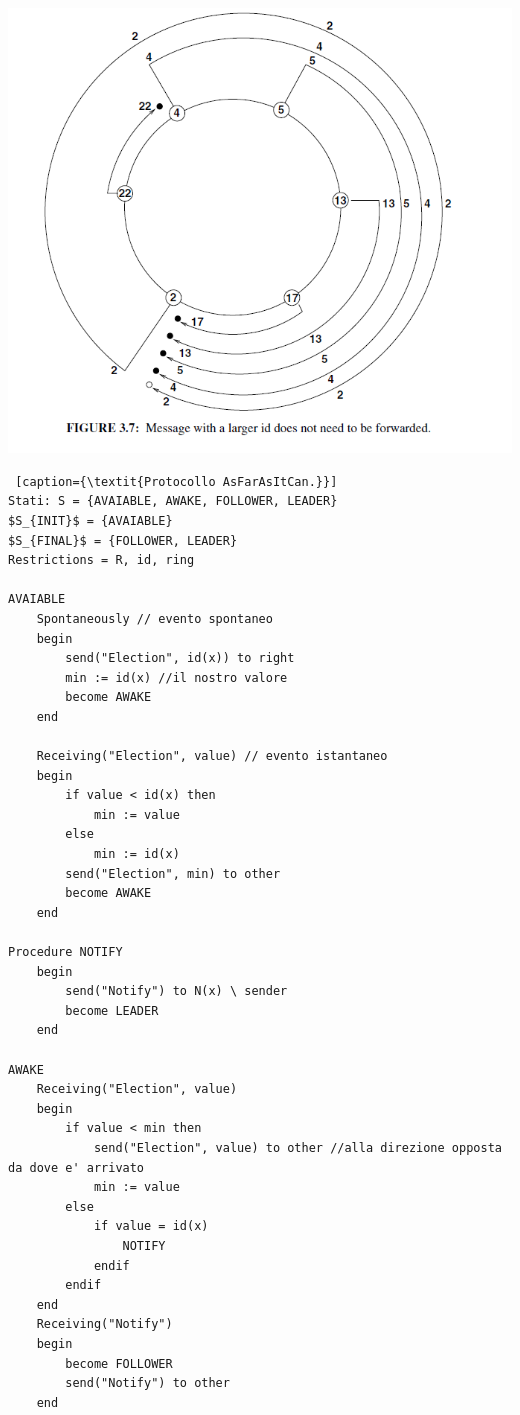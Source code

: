 \begin{center}
  \includegraphics[scale=0.5]{images/asFar.png}
\end{center}

\begin{lstlisting} [caption={\textit{Protocollo AsFarAsItCan.}}]
Stati: S = {AVAIABLE, AWAKE, FOLLOWER, LEADER}
$S_{INIT}$ = {AVAIABLE}
$S_{FINAL}$ = {FOLLOWER, LEADER}
Restrictions = R, id, ring

AVAIABLE
    Spontaneously // evento spontaneo
    begin
        send("Election", id(x)) to right
        min := id(x) //il nostro valore
        become AWAKE
    end
    
    Receiving("Election", value) // evento istantaneo
    begin
        if value < id(x) then
            min := value
        else
        	min := id(x)
        send("Election", min) to other
        become AWAKE
    end

Procedure NOTIFY
    begin
        send("Notify") to N(x) \ sender
        become LEADER
    end

AWAKE
    Receiving("Election", value)
    begin
        if value < min then
            send("Election", value) to other //alla direzione opposta da dove e' arrivato
            min := value
        else
            if value = id(x)
                NOTIFY
            endif
        endif
    end
    Receiving("Notify")
    begin
        become FOLLOWER
        send("Notify") to other
    end
\end{lstlisting}

